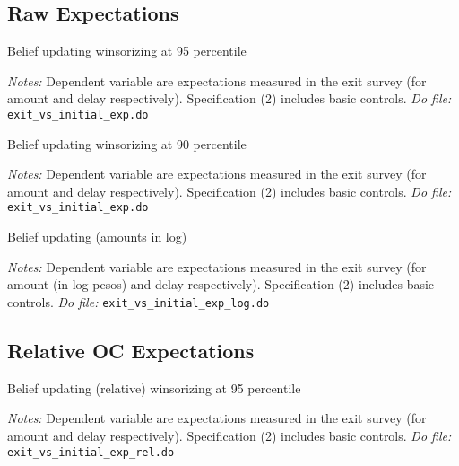 \documentclass[11pt]{article}
\begin{document}
\begin{landscape}

\subsection{Raw Expectations}

 \begin{table}[H]
 \caption{Belief updating winsorizing at 95 percentile}
 \label{Belief_updating}
 \begin{center}
 \scriptsize{}
 \end{center}
  \footnotesize
 \textit{Notes:} 
 Dependent variable are expectations measured in the exit survey (for amount and delay respectively). Specification (2) includes basic controls.
 \textit{Do file: } \texttt{exit\_vs\_initial\_exp.do}
 \end{table}

 \begin{table}[H]
 \caption{Belief updating winsorizing at 90 percentile}
 \label{Belief_updating}
 \begin{center}
 \scriptsize{}
 \end{center}
  \footnotesize
 \textit{Notes:} 
 Dependent variable are expectations measured in the exit survey (for amount and delay respectively). Specification (2) includes basic controls.
 \textit{Do file: } \texttt{exit\_vs\_initial\_exp.do}
 \end{table}


 \begin{table}[H]
 \caption{Belief updating (amounts in log)}
 \label{Belief_updating_log}
 \begin{center}
 \scriptsize{}
 \end{center}
  \footnotesize
 \textit{Notes:} 
 Dependent variable are expectations measured in the exit survey (for amount (in log pesos) and delay respectively). Specification (2) includes basic controls.
 \textit{Do file: } \texttt{exit\_vs\_initial\_exp\_log.do}
 \end{table}





\subsection{Relative OC Expectations}

 \begin{table}[H]
 \caption{Belief updating (relative) winsorizing at 95 percentile}
 \label{Belief_updating}
 \begin{center}
 \scriptsize{}
 \end{center}
  \footnotesize
 \textit{Notes:} 
 Dependent variable are expectations measured in the exit survey (for amount and delay respectively). Specification (2) includes basic controls.
 \textit{Do file: } \texttt{exit\_vs\_initial\_exp\_rel.do}
 \end{table}


\end{landscape}
\end{document}
